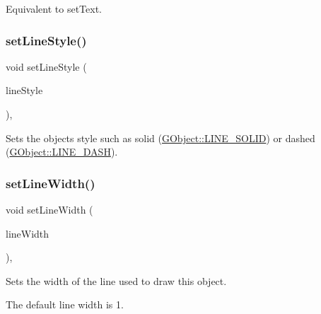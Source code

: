 Equivalent to set\+Text. \mbox{\label{classsgl_1_1GObject_add11575087eb94f1a71faa3f826c6341}} 
\subsubsection{\texorpdfstring{set\+Line\+Style()}{setLineStyle()}}
{\footnotesize\ttfamily void set\+Line\+Style (\begin{DoxyParamCaption}\item[{\mbox{\hyperlink{classsgl_1_1GObject_a86e0f5648542856159bb40775c854aa7}{G\+Object\+::\+Line\+Style}}}]{line\+Style }\end{DoxyParamCaption})\hspace{0.3cm}{\ttfamily [virtual]}, {\ttfamily [inherited]}}



Sets the object\textquotesingle{}s style such as solid (\mbox{\hyperlink{classsgl_1_1GObject_a86e0f5648542856159bb40775c854aa7a700c78bc2cd76acaab26651bf7b4941f}{G\+Object\+::\+L\+I\+N\+E\+\_\+\+S\+O\+L\+ID}}) or dashed (\mbox{\hyperlink{classsgl_1_1GObject_a86e0f5648542856159bb40775c854aa7a9ccba0845f785d81d07b333ae1aad84e}{G\+Object\+::\+L\+I\+N\+E\+\_\+\+D\+A\+SH}}). 

\mbox{\label{classsgl_1_1GObject_afd6a47c6ea6a1f85ca05a65ba3ff3477}} 
\subsubsection{\texorpdfstring{set\+Line\+Width()}{setLineWidth()}}
{\footnotesize\ttfamily void set\+Line\+Width (\begin{DoxyParamCaption}\item[{double}]{line\+Width }\end{DoxyParamCaption})\hspace{0.3cm}{\ttfamily [virtual]}, {\ttfamily [inherited]}}



Sets the width of the line used to draw this object. 

The default line width is 1. \mbox{\label{classsgl_1_1GObject_a04594e8ba9b98513a64f1da00dcae18c}} 

